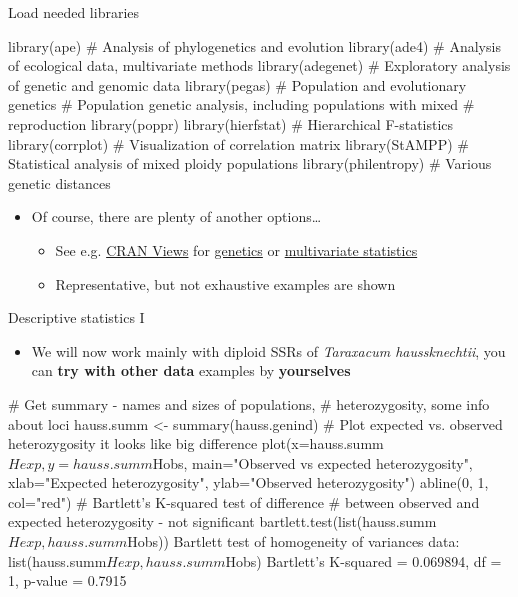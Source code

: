 \documentclass[compress, ucs, xelatex, 11pt, xcolor=svgnames, aspectratio=169,
	hyperref={
		bookmarks=true,
		unicode=true,
		colorlinks=true,
		pdftitle={Molecular data in R},
		plainpages=false,
		pdfauthor={Vojtech Zeisek},
		pdfsubject={Course about phylogeny and evolution in R},
		pdfcreator={XeLaTeX},
		pdfkeywords={R, evolution, phylogeny, molecular data},
		linkcolor=Crimson, %
		anchorcolor=Magenta, %
		citecolor=Magenta, %
		filecolor=Magenta, %
		menucolor=Magenta, %
		urlcolor=DodgerBlue, %
		pdftex},
	url={hyphens, lowtilde} %
	]{beamer}
\begin{document}
\begin{frame}[fragile]{Load needed libraries}
	\begin{spluscode}
    library(ape) # Analysis of phylogenetics and evolution
    library(ade4) # Analysis of ecological data, multivariate methods
    library(adegenet) # Exploratory analysis of genetic and genomic data
    library(pegas) # Population and evolutionary genetics
    # Population genetic analysis, including populations with mixed
    # reproduction
    library(poppr)
    library(hierfstat) # Hierarchical F-statistics
    library(corrplot) # Visualization of correlation matrix
    library(StAMPP) # Statistical analysis of mixed ploidy populations
    library(philentropy) # Various genetic distances
	\end{spluscode}
	\begin{itemize}
		\item Of course, there are plenty of another options\ldots
		\begin{itemize}
			\item See e.g. \href{https://cran.r-project.org/web/views/}{CRAN Views} for \href{https://cran.r-project.org/web/views/Genetics.html}{genetics} or \href{https://cran.r-project.org/web/views/Multivariate.html}{multivariate statistics}
			\item Representative, but not exhaustive examples are shown
		\end{itemize}
	\end{itemize}
\end{frame}

\begin{frame}[fragile]{Descriptive statistics I}
	\label{popgenindx}
	\begin{itemize}
		\item We will now work mainly with diploid SSRs of \textit{Taraxacum haussknechtii}, you can \textbf{try with other data} examples by \textbf{yourselves}
	\end{itemize}
	\begin{spluscode}
    # Get summary - names and sizes of populations,
    # heterozygosity, some info about loci
    hauss.summ <- summary(hauss.genind)
    # Plot expected vs. observed heterozygosity it looks like big difference
    plot(x=hauss.summ$Hexp, y=hauss.summ$Hobs,
      main="Observed vs expected heterozygosity",
      xlab="Expected heterozygosity", ylab="Observed heterozygosity")
    abline(0, 1, col="red")
    # Bartlett's K-squared test of difference
    # between observed and expected heterozygosity - not significant
    bartlett.test(list(hauss.summ$Hexp, hauss.summ$Hobs))
                  Bartlett test of homogeneity of variances
    data:  list(hauss.summ$Hexp, hauss.summ$Hobs)
    Bartlett's K-squared = 0.069894, df = 1, p-value = 0.7915
	\end{spluscode}
\end{frame}
\end{document}
